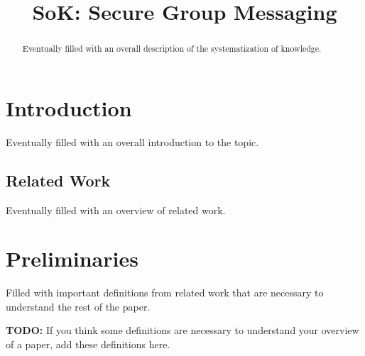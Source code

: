 \documentclass[a4paper,orivec]{llncs}
\title{SoK: Secure Group Messaging}
\author{}
\newcommand{\alert}[1]{{\color{red}#1}}
\begin{document}
    
\maketitle
\begin{abstract}
\alert{Eventually filled with an overall description of the systematization of knowledge.}
\end{abstract}

\section{Introduction}
\alert{Eventually filled with an overall introduction to the topic.}

\subsection{Related Work}
\alert{Eventually filled with an overview of related work.}

\section{Preliminaries}
\alert{Filled with important definitions from related work that are necessary to understand the rest of the paper.}

\alert{\textbf{TODO:} If you think some definitions are necessary to understand your overview of a paper, add these definitions here.}



























\end{document}

